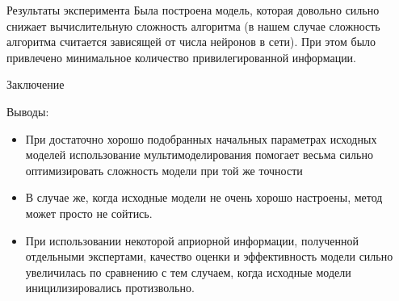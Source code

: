 \documentclass{beamer}
\begin{document}
\begin{frame}{Результаты эксперимента}
Была построена модель, которая довольно сильно снижает вычислительную сложность алгоритма (в нашем случае сложность алгоритма считается зависящей от числа нейронов в сети). При этом было привлечено минимальное количество привилегированной информации. 
\end{frame}


\begin{frame}{Заключение}
\begin{block}{Выводы:}
\begin{itemize}
  \item При достаточно хорошо подобранных начальных параметрах исходных моделей использование мультимоделирования помогает весьма сильно оптимизировать сложность модели при той же точности

  \item В случае же, когда исходные модели не очень хорошо настроены, метод может просто не сойтись.

\item При использовании некоторой априорной  информации, полученной отдельными экспертами,  качество оценки и эффективность модели сильно увеличилась по сравнению с тем случаем, когда исходные модели иницилизировались протизвольно.

\end{itemize}
\end{block}
\end{frame}
\end{document}
